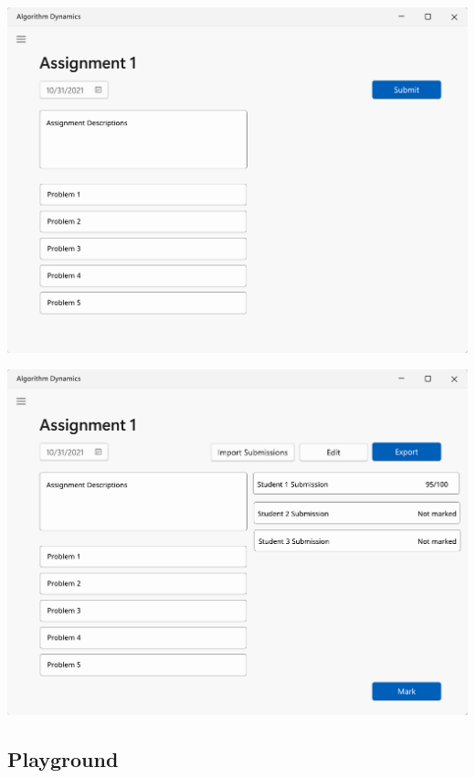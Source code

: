 \documentclass[a4paper]{report}
\begin{document}
\includegraphics[width=\textwidth, height=\textheight, keepaspectratio]{AssignmentsStudentDetailsPage-Design}

\includegraphics[width=\textwidth, height=\textheight, keepaspectratio]{AssignmentsTeacherDetailsPage-Design}

\subsection{Playground}
\end{document}
